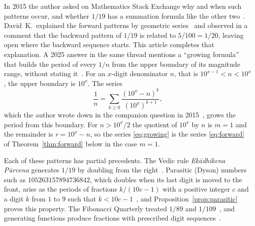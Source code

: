 \documentclass[11pt,a4paper]{amsart}
\theoremstyle{definition}
\theoremstyle{remark}
\begin{document}
In 2015 the author asked on Mathematics Stack Exchange why and when such
patterns occur, and whether $1/19$ has a summation formula like the other
two~\cite{mse1365506}. David~K.\ explained the forward patterns by geometric
series~\cite{mse1365506,mse1372077} and observed in a comment that the backward
pattern of $1/19$ is related to $5/100 = 1/20$, leaving open where the backward
sequence starts. This article completes that explanation. A 2025 answer in the
same thread mentions a ``growing formula'' that builds the period of every
$1/n$ from the upper boundary of its magnitude range, without stating
it~\cite{mse1365506}. For an $x$-digit denominator $n$, that is
$10^{x-1} < n < 10^x$, the upper boundary is $10^x$. The series
\begin{equation}\label{eq:growing}
\frac1n = \sum_{k\ge0} \frac{(10^x - n)^k}{(10^x)^{k+1}},
\end{equation}
which the author wrote down in the companion question in
2015~\cite{mse1372077}, grows the period from this boundary.
For $n > 10^x/2$ the quotient of $10^x$ by $n$ is $m = 1$ and the remainder is $r = 10^x - n$, so the series \eqref{eq:growing} is the series \eqref{eq:forward} of Theorem~\ref{thm:forward} below in the case $m = 1$.

Each of these patterns has partial precedents. The Vedic rule \emph{Ekādhikena Pūrvena} generates $1/19$ by doubling
from the right~\cite{tadepalli}. Parasitic (Dyson) numbers such as
$105263157894736842$, which doubles when its last digit is moved to the front,
arise as the periods of fractions $k/(10c-1)$ with a positive integer $c$ and a digit $k$ from $1$ to $9$ such that $k < 10c - 1$~\cite{wiki-parasitic,mathpages859}, and Proposition~\ref{prop:parasitic} proves this property. The Fibonacci Quarterly treated $1/89$
and $1/109$~\cite{long1981,bicknell1989}, and generating functions produce
fractions with prescribed digit sequences~\cite{munafo}. 
\end{document}
